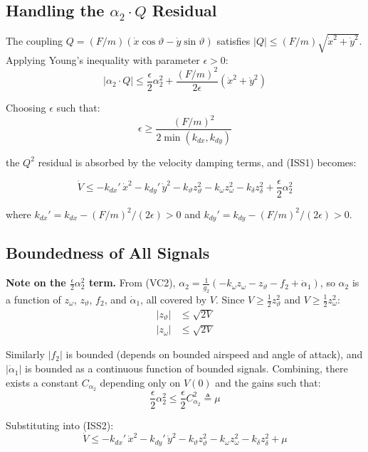 \documentclass[11pt,a4paper]{article}
\theoremstyle{plain}
\theoremstyle{remark}
\newcommand{\vth}{\vartheta}
\newcommand{\zth}{z_{\vth}}
\newcommand{\zom}{z_{\omega}}
\newcommand{\zdel}{z_{\delta}}
\begin{document}
\subsection{Handling the \texorpdfstring{$\alpha_2 \cdot Q$}{alpha2 Q} Residual}

The coupling $Q = (F/m)(\dot x\cos\vth - \dot y\sin\vth)$ satisfies $|Q| \leq (F/m)\sqrt{\dot x^2 + \dot y^2}$. Applying Young's inequality with parameter $\epsilon > 0$:
\[
  |\alpha_2\cdot Q| \leq \frac{\epsilon}{2}\alpha_2^2 + \frac{(F/m)^2}{2\epsilon}(\dot x^2 + \dot y^2)
\]

Choosing $\epsilon$ such that:
\begin{equation}
  \epsilon \geq \frac{(F/m)^2}{2\min(k_{dx}, k_{dy})}
  \tag{C-eps}
\end{equation}

the $Q^2$ residual is absorbed by the velocity damping terms, and (ISS1) becomes:

\begin{equation}
  \dot V \leq -k_{dx}'\,\dot x^2 - k_{dy}'\,\dot y^2 - k_\vth \zth^2 - k_\omega\zom^2 - k_\delta\zdel^2 + \frac{\epsilon}{2}\alpha_2^2
  \tag{ISS2}
\end{equation}

where $k_{dx}' = k_{dx} - (F/m)^2/(2\epsilon) > 0$ and $k_{dy}' = k_{dy} - (F/m)^2/(2\epsilon) > 0$.

\subsection{Boundedness of All Signals}

\textbf{Note on the $\tfrac{\epsilon}{2}\alpha_2^2$ term.} From (VC2), $\alpha_2 = \tfrac{1}{g_2}(-k_\omega\zom - \zth - f_2 + \dot\alpha_1)$, so $\alpha_2$ is a function of $\zom$, $\zth$, $f_2$, and $\dot\alpha_1$, all covered by $V$. Since $V \geq \tfrac{1}{2}\zth^2$ and $V \geq \tfrac{1}{2}\zom^2$:
\begin{align}
  |\zth| &\leq \sqrt{2V} \\
  |\zom| &\leq \sqrt{2V}
\end{align}

Similarly $|f_2|$ is bounded (depends on bounded airspeed and angle of attack), and $|\dot\alpha_1|$ is bounded as a continuous function of bounded signals. Combining, there exists a constant $C_{\alpha_2}$ depending only on $V(0)$ and the gains such that:
\[
  \frac{\epsilon}{2}\alpha_2^2 \leq \frac{\epsilon}{2}C_{\alpha_2}^2 \triangleq \mu
\]

Substituting into (ISS2):
\begin{equation}
  \dot V \leq -k_{dx}'\,\dot x^2 - k_{dy}'\,\dot y^2 - k_\vth \zth^2 - k_\omega\zom^2 - k_\delta\zdel^2 + \mu
  \tag{ISS3}
\end{equation}
\end{document}
